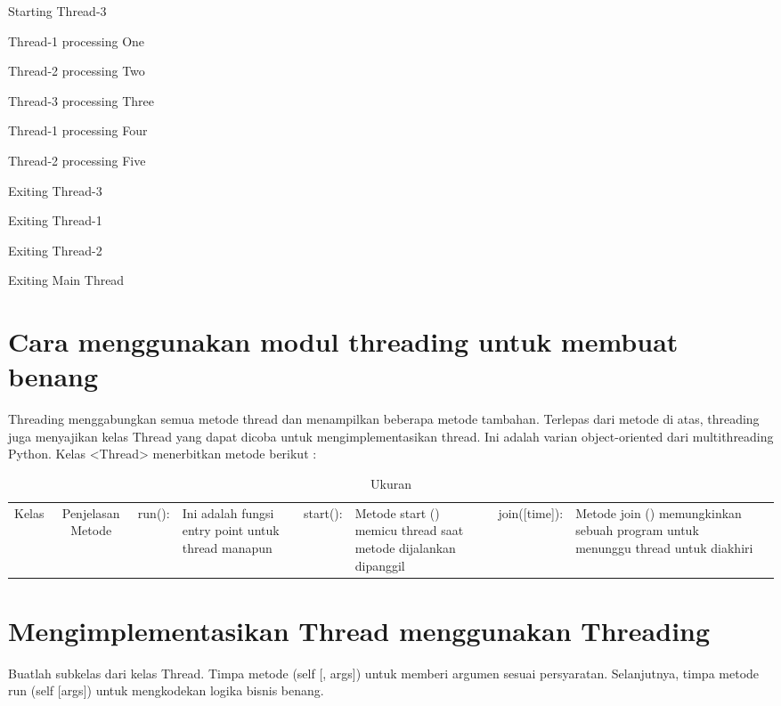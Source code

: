 \begin{itemize}
{\fontsize{10pt}{10pt}\selectfont Starting Thread-3} 
 
{\fontsize{10pt}{10pt}\selectfont Thread-1 processing One} 
 
{\fontsize{10pt}{10pt}\selectfont Thread-2 processing Two} 
 
{\fontsize{10pt}{10pt}\selectfont Thread-3 processing Three} 
 
{\fontsize{10pt}{10pt}\selectfont Thread-1 processing Four} 
 
{\fontsize{10pt}{10pt}\selectfont Thread-2 processing Five} 
 
{\fontsize{10pt}{10pt}\selectfont Exiting Thread-3} 
 
{\fontsize{10pt}{10pt}\selectfont Exiting Thread-1} 
 
{\fontsize{10pt}{10pt}\selectfont Exiting Thread-2} 
 
{\fontsize{10pt}{10pt}\selectfont Exiting Main Thread} 

\section{Cara menggunakan modul threading untuk membuat benang}
\hspace*{0.5in} Threading menggabungkan semua metode thread dan menampilkan beberapa metode tambahan. Terlepas dari metode di atas, threading juga menyajikan kelas Thread yang dapat dicoba untuk mengimplementasikan thread. Ini adalah varian object-oriented dari multithreading Python. Kelas <Thread> menerbitkan metode berikut :

\begin{table}[ht]
	\caption{Ukuran}
	\begin{tabular*}{\textwidth}{@{\extracolsep{\fill}}lcc}
		\hline
		Kelas&  Penjelasan Metode&\cr
		\hline
		run():&Ini adalah fungsi entry point untuk thread manapun&\cr
		start():&Metode start () memicu thread saat metode dijalankan dipanggil&\cr
		join([time]):&Metode join () memungkinkan sebuah program untuk menunggu thread untuk diakhiri&\cr
		\hline
	\end{tabular*}
	\begin{tablenotes}
	\end{tablenotes}
\end{table}

\section{Mengimplementasikan Thread menggunakan Threading}
\hspace*{0.5in} Buatlah subkelas dari kelas Thread. Timpa metode (self [, args]) untuk memberi argumen sesuai persyaratan. Selanjutnya, timpa metode run (self [args]) untuk mengkodekan logika bisnis benang.


\end{itemize}
